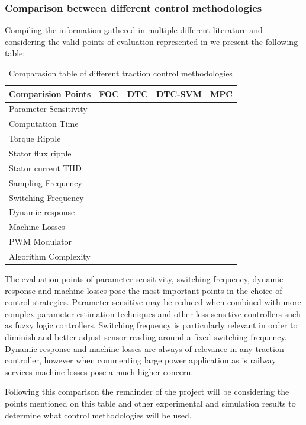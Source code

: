 \subsubsection{Comparison between different control methodologies}
Compiling the information gathered in multiple different literature and considering the valid points of evaluation represented in \cite{MainSOTA} we present the following table:
\begin{table}[h]
\centering
\caption{Comparasion table of different traction control methodologies \cite{MainSOTA}}

\begin{tabular}{l|l|l|l|l}\hline\hline
 Comparision Points& FOC & DTC & DTC-SVM & MPC \\\hline
 Parameter Sensitivity &  &  &  &  \\
 Computation Time&  &  &  &  \\
 Torque Ripple &  &  &  & \\
 Stator flux ripple &  &  &  &  \\
 Stator current THD &  &  &  &  \\
 Sampling Frequency &  &  &  & \\
 Switching Frequency &  &  &  & \\
 Dynamic response &  &  &  &  \\
 Machine Losses &  &  &  &  \\
 PWM Modulator &  &  &  &  \\
 Algorithm Complexity &  &  &  & \\\hline \hline
\end{tabular}

\end{table}
The evaluation points of parameter sensitivity, switching frequency, dynamic response and machine losses pose the most important points in the choice of control strategies. Parameter sensitive may be reduced when combined with more complex parameter estimation techniques and other less sensitive controllers such as fuzzy logic controllers. Switching frequency is particularly relevant in order to diminish and better adjust sensor reading around a fixed switching frequency. Dynamic response and machine losses are always of relevance in any traction controller, however when commenting large power application as is railway services machine losses pose a much higher concern.

Following this comparison the remainder of the project will be considering the points mentioned on this table and other experimental and simulation results to determine what control methodologies will be used.

